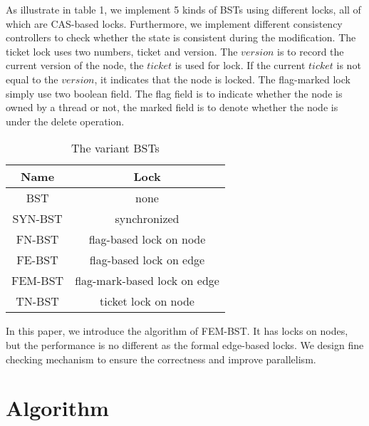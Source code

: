 \documentclass{article}
\begin{document}
As illustrate in table 1, we implement 5 kinds of BSTs using different locks, all of which are CAS-based locks. Furthermore, we implement different consistency controllers to check whether the state is consistent during the modification. The ticket lock uses two numbers, ticket and version. The $version$ is to record the current version of the node, the $ticket$ is used for lock. If the current $ticket$ is not equal to the $version$, it indicates that the node is locked. The flag-marked lock simply use two boolean field. The flag field is to indicate whether the node is owned by a thread or not, the marked field is to denote whether the node is under the delete operation.
\begin{table}[htbp]
\centering
\begin{tabular}{c|c}
\hline
Name & Lock \\
\hline
BST & none \\
SYN-BST & synchronized \\
FN-BST & flag-based lock on node \\
FE-BST & flag-based lock on edge \\
FEM-BST & flag-mark-based lock on edge \\
TN-BST & ticket lock on node \\
\hline
\end{tabular}
\caption{The variant BSTs}
\label{tab:my_label1}
\end{table}
In this paper, we introduce the algorithm of FEM-BST. It has locks on nodes, but the performance is no different as the formal edge-based locks. We design fine checking mechanism to ensure the correctness and improve parallelism. 

\section{Algorithm}
\end{document}
